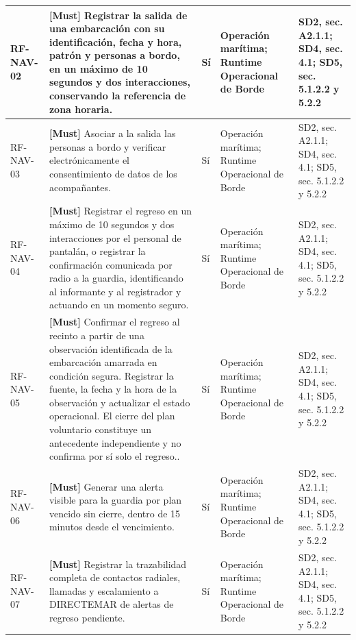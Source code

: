 \begin{paginaHorizontalSynaptix}
\begin{longtable}{|L{0.09\AnchoMatrizTDoce}|L{0.385\AnchoMatrizTDoce}|L{0.065\AnchoMatrizTDoce}|L{0.18\AnchoMatrizTDoce}|L{0.28\AnchoMatrizTDoce}|}
RF-\allowbreak{}NAV-\allowbreak{}02 &
\textbf{[Must]} Registrar la salida de una embarcación con su identificación, fecha y hora, patrón y personas a bordo, en un máximo de 10 segundos y dos interacciones, conservando la referencia de zona horaria. &
Sí &
Operación marítima; Runtime Operacional de Borde &
SD2, sec. A2.1.1; SD4, sec. 4.1; SD5, sec. 5.1.2.2 y 5.2.2 \\ \hline

RF-\allowbreak{}NAV-\allowbreak{}03 &
\textbf{[Must]} Asociar a la salida las personas a bordo y verificar electrónicamente el consentimiento de datos de los acompañantes. &
Sí &
Operación marítima; Runtime Operacional de Borde &
SD2, sec. A2.1.1; SD4, sec. 4.1; SD5, sec. 5.1.2.2 y 5.2.2 \\ \hline

RF-\allowbreak{}NAV-\allowbreak{}04 &
\textbf{[Must]} Registrar el regreso en un máximo de 10 segundos y dos interacciones por el personal de pantalán, o registrar la confirmación comunicada por radio a la guardia, identificando al informante y al registrador y actuando en un momento seguro. &
Sí &
Operación marítima; Runtime Operacional de Borde &
SD2, sec. A2.1.1; SD4, sec. 4.1; SD5, sec. 5.1.2.2 y 5.2.2 \\ \hline

RF-\allowbreak{}NAV-\allowbreak{}05 &
\textbf{[Must]} Confirmar el regreso al recinto a partir de una observación identificada
de la embarcación amarrada en condición segura. Registrar la fuente,
la fecha y la hora de la observación y actualizar el estado operacional.
El cierre del plan voluntario constituye un antecedente independiente
y no confirma por sí solo el regreso.. &
Sí &
Operación marítima; Runtime Operacional de Borde &
SD2, sec. A2.1.1; SD4, sec. 4.1; SD5, sec. 5.1.2.2 y 5.2.2 \\ \hline

RF-\allowbreak{}NAV-\allowbreak{}06 &
\textbf{[Must]} Generar una alerta visible para la guardia por plan vencido sin cierre, dentro de 15 minutos desde el vencimiento. &
Sí &
Operación marítima; Runtime Operacional de Borde &
SD2, sec. A2.1.1; SD4, sec. 4.1; SD5, sec. 5.1.2.2 y 5.2.2 \\ \hline

RF-\allowbreak{}NAV-\allowbreak{}07 &
\textbf{[Must]} Registrar la trazabilidad completa de contactos radiales, llamadas y escalamiento a DIRECTEMAR de alertas de regreso pendiente. &
Sí &
Operación marítima; Runtime Operacional de Borde &
SD2, sec. A2.1.1; SD4, sec. 4.1; SD5, sec. 5.1.2.2 y 5.2.2 \\ \hline


\end{longtable}
\end{paginaHorizontalSynaptix}

